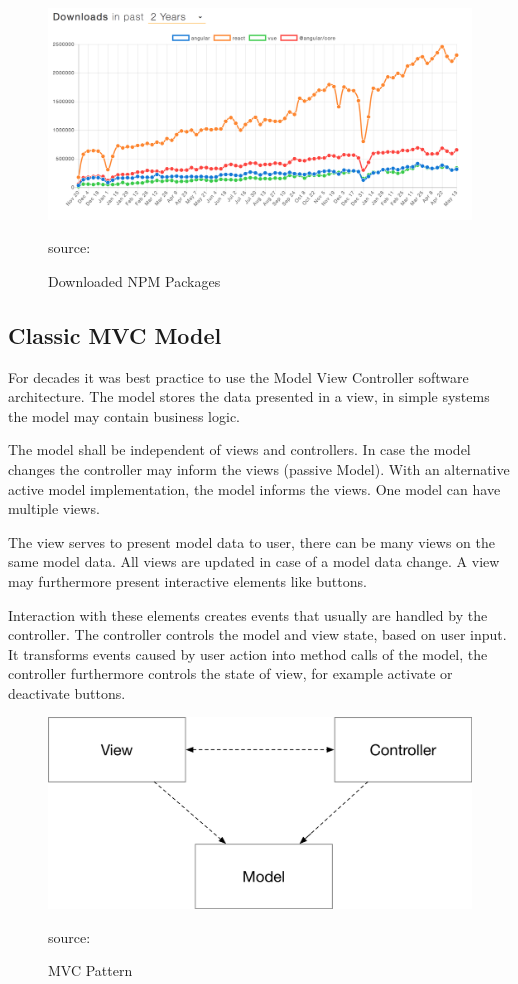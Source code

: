 \begin{figure}[H]
	\centering
	\includegraphics[scale=0.4]{bilder/grundlagen/ReactDownloads.png}
	\caption{Downloaded NPM Packages} source:\cite{NPM}
	\label{fig:JS}
\end{figure}


\subsection{Classic MVC Model}
For decades it was best practice to use the Model View Controller software architecture. The model stores the data presented in a view, in simple systems the model may contain business logic.

The model shall be independent of views and controllers. In case the model changes the controller may inform the views (passive Model). With an alternative active model implementation, the model informs the views. One model can have multiple views.
 
The view serves to present model data to user, there can be many views on the same model data. All views are updated in case of a model data change. A view may furthermore present interactive elements like buttons. 
 
Interaction with these elements creates events that usually are handled by the controller. The controller controls the model and view state, based on user input. It transforms events caused by user action into method calls of the model, the controller furthermore controls the state of view, for example activate or deactivate buttons.


\begin{figure}[H]
	\centering
	\includegraphics[width=0.8\linewidth]{bilder/grundlagen/MVC.png}
	\caption{MVC Pattern} source:\cite{GOLL}
	\label{fig:MVC}
\end{figure}


